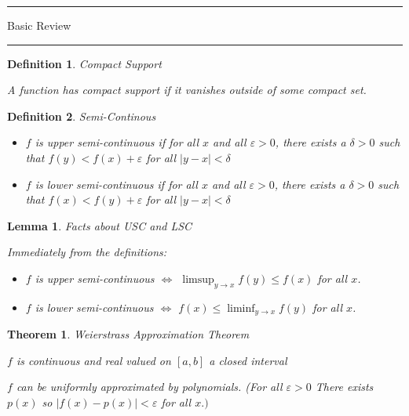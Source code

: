 \documentclass[12pt]{Qual}
\newtheorem{theorem}{Theorem}
\newtheorem{definition}{Definition}
\newtheorem{lemma}{Lemma}
\begin{document}
\begin{center}
\noindent\textcolor{blue!60!black}{\rule{15cm}{1mm}}
\Huge \faBug\faPuzzlePiece\faCoffee Basic Review \faCoffee\faPuzzlePiece\faBug
\vspace{-0.5cm}
\noindent\textcolor{blue!60!black}{\rule{15cm}{1mm}}
\end{center}
\vspace{0.5cm}
\begin{definition}{\Large\textit{Compact Support}}

A function has compact support if it vanishes outside of some compact set.

\end{definition}
\vspace{0.5cm}
\begin{definition}{\Large\textit{Semi-Continous}}

\begin{itemize}
\renewcommand\labelitemi{\faCoffee}
    \item $f$ is upper semi-continuous if for all $x$ and all $\varepsilon>0$, there exists a $\delta>0$ such that $f(y)<f(x)+\varepsilon$ for all $|y-x|<\delta$
    \item $f$ is lower semi-continuous if for all $x$ and all $\varepsilon>0$, there exists a $\delta>0$ such that $f(x)<f(y)+\varepsilon$ for all $|y-x|<\delta$
\end{itemize}

\end{definition}
\vspace{0.5cm}
\begin{lemma}{\Large\textit{Facts about USC and LSC}}

Immediately from the definitions:
\begin{itemize}
\renewcommand\labelitemi{\faCoffee}
    \item $f$ is upper semi-continuous $\iff$ $\limsup_{y\to x}f(y)\le f(x)$ for all $x$.
    \item $f$ is lower semi-continuous $\iff$ $f(x)\le\liminf_{y\to x}f(y)$
 for all $x$.
 \end{itemize}

\end{lemma}
\vspace{0.5cm}
\begin{theorem}{\Large\textit{Weierstrass Approximation Theorem}}

$f$ is continuous and real valued on $[a,b]$ a closed interval

 \begin{minipage}{0.85\textwidth}
\vspace{0.45cm}
$f$ can be uniformly approximated by polynomials. (For all $\varepsilon>0$ There exists $p(x)$ so $|f(x)-p(x)|<\varepsilon$ for all $x.)$
\end{minipage}

\end{theorem}
\end{document}
